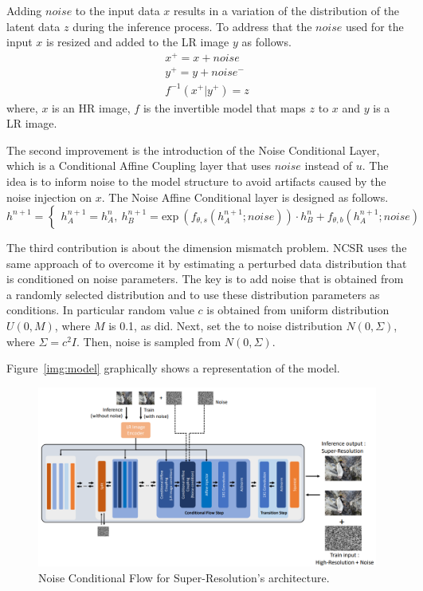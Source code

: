 \documentclass{article}
\begin{document}
Adding $noise$ to the input data $x$ results in a variation of the distribution of the latent data $z$ during the inference process. To address that the $noise$ used for the input $x$ is resized and added to the LR image $y$ as follows.
\begin{align*}
    x^+ = x + noise \\
    y^+ = y + noise^- \\
    f^{-1}(x^+|y^+) = z 
\end{align*}
where, $x$ is an HR image, $f$ is the invertible model that maps $z$ to $x$ and $y$ is a LR image. 

The second improvement is the introduction of the Noise Conditional Layer, which is a Conditional Affine Coupling layer that uses $noise$ instead of $u$. The idea is to inform noise to the model structure to avoid artifacts caused by the noise injection on $x$. The Noise Affine Conditional layer is designed as follows.
\begin{equation}
    h^{n+1} = \begin{cases}
        h^{n+1}_A = h^{n}_A, \:
        h^{n+1}_B = \text{exp}\:(f_{\theta, s}( h^{n+1}_A; noise)) \cdot h^n_B + f_{\theta, b}( h^{n+1}_A; noise)
    \end{cases}
\end{equation} 

The third contribution is about the dimension mismatch problem. NCSR uses the same approach of \cite{SoftFlow} to overcome it by estimating a perturbed data distribution that is conditioned on noise parameters. The key is to add noise that is obtained from a randomly selected distribution and to use these distribution parameters as conditions. In particular random value $c$ is obtained from uniform distribution $U(0, M)$, where $M$ is 0.1, as \cite{SoftFlow} did. Next, set the to noise distribution $N(0, \Sigma)$, where $\Sigma = c^2I$. Then, noise is sampled from $N(0, \Sigma)$.


Figure~\ref{img:model} graphically shows a representation of the model.

\begin{figure}[h]
    \centering
    \includegraphics[scale=.45]{model_2}
    \caption{Noise Conditional Flow for Super-Resolution's architecture.}
    \label{img:model_2}
\end{figure}
\end{document}
